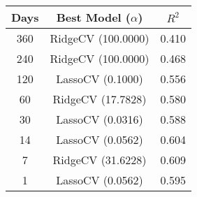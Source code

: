 \begin{tabular}{||c c c||}
\hline
Days & Best Model ($\alpha$) & $R^2$ \\
\hline\hline
360 & RidgeCV (100.0000) & 0.410 \\
240 & RidgeCV (100.0000) & 0.468 \\
120 & LassoCV (0.1000) & 0.556 \\
60 & RidgeCV (17.7828) & 0.580 \\
30 & LassoCV (0.0316) & 0.588 \\
14 & LassoCV (0.0562) & 0.604 \\
7 & RidgeCV (31.6228) & 0.609 \\
1 & LassoCV (0.0562) & 0.595 \\
\hline
\end{tabular}
